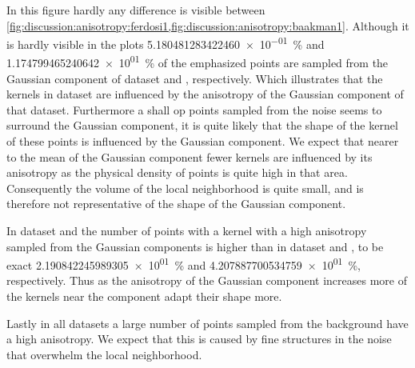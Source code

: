 			In this figure hardly any difference is visible between \cref{fig:discussion:anisotropy:ferdosi1,fig:discussion:anisotropy:baakman1}. 
				Although it is hardly visible in the plots \SI{5.180481283422460e-01}{\percent} and \SI{1.174799465240642e+01}{\percent} of the emphasized points are sampled from the Gaussian component of dataset \ferdosiOne and \baakmanOne, respectively. Which illustrates that the kernels in dataset \baakmanOne are influenced by the anisotropy of the Gaussian component of that dataset.
				Furthermore a shall op points sampled from the noise seems to surround the Gaussian component, it is quite likely that the shape of the kernel of these points is influenced by the Gaussian component. 
				We expect that nearer to the mean of the Gaussian component fewer kernels are influenced by its anisotropy as the physical density of points is quite high in that area. Consequently the volume of the local neighborhood is quite small, and is therefore not representative of the shape of the Gaussian component. 

			In dataset \baakmanFour and \baakmanFive the number of points with a kernel with a high anisotropy sampled from the Gaussian components is higher than in dataset \ferdosiOne and \baakmanOne, to be exact \SI{2.190842245989305e+01}{\percent} and \SI{4.207887700534759e+01}{\percent}, respectively. Thus as the anisotropy of the Gaussian component increases more of the kernels near the component adapt their shape more. 
		

		Lastly in all datasets a large number of points sampled from the background have a high anisotropy. We expect that this is caused by fine structures in the noise that overwhelm the local neighborhood.




